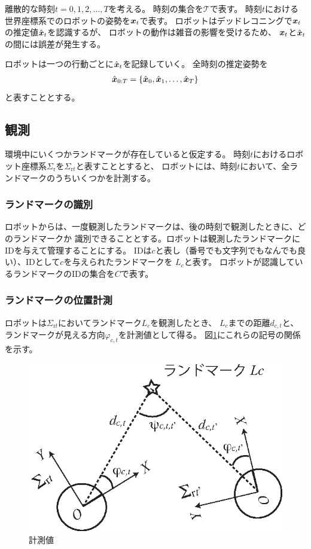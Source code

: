 
離散的な時刻$t = 0,1,2,\dots,T$を考える。
時刻の集合を$\mathcal{T}$で表す。
時刻$t$における世界座標系でのロボットの姿勢を$\boldsymbol{x}_t$で表す。
ロボットはデッドレコニングで$\boldsymbol{x}_t$の推定値$\hat{\boldsymbol{x}}_t$を認識するが、
ロボットの動作は雑音の影響を受けるため、
$\boldsymbol{x}_t$と$\hat{\boldsymbol{x}}_t$の間には誤差が発生する。


ロボットは一つの行動ごとに$\hat{\boldsymbol{x}}_t$を記録していく。
全時刻の推定姿勢を
\begin{align}
\hat{\boldsymbol{x}}_{0:T} = \{\hat{\boldsymbol{x}}_0, \hat{\boldsymbol{x}}_1, \dots, \hat{\boldsymbol{x}}_T \}
\end{align}
と表すこととする。

\subsection{観測}

環境中にいくつかランドマークが存在していると仮定する。
時刻$t$におけるロボット座標系$\Sigma_\text{r}$を$\Sigma_{\text{r}t}$と表すこととすると、
ロボットには、時刻$t$において、全ランドマークのうちいくつかを計測する。

\subsubsection{ランドマークの識別}

ロボットからは、一度観測したランドマークは、後の時刻で観測したときに、どのランドマークか
識別できることとする。ロボットは観測したランドマークにIDを与えて管理することにする。
IDは$c$と表し（番号でも文字列でもなんでも良い）、IDとして$c$を与えられたランドマークを
$L_c$と表す。
ロボットが認識しているランドマークのIDの集合を$C$で表す。

\subsubsection{ランドマークの位置計測}

ロボットは$\Sigma_{\text{r}t}$においてランドマーク$L_c$を観測したとき、
$L_c$までの距離$d_{c,t}$と、ランドマークが見える方向$\varphi_{c,t}$を計測値として得る。
図\ref{fig:observation}にこれらの記号の関係を示す。

\begin{figure}[htbp]
	\begin{center}
		\includegraphics[width=0.5\linewidth]{./figs/observation.eps}
		\caption{計測値}
		\label{fig:observation}
	\end{center}
\end{figure}

